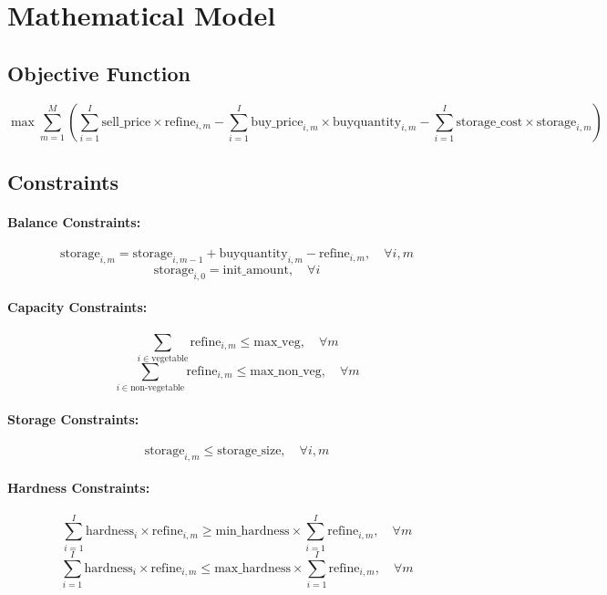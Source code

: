 \documentclass{article}
\begin{document}
\section*{Mathematical Model}

\subsection*{Objective Function}
\[
\max \sum_{m=1}^{M} \left( \sum_{i=1}^{I} \text{sell\_price} \times \text{refine}_{i,m} - \sum_{i=1}^{I} \text{buy\_price}_{i,m} \times \text{buyquantity}_{i,m} - \sum_{i=1}^{I} \text{storage\_cost} \times \text{storage}_{i,m} \right)
\]

\subsection*{Constraints}

\paragraph{Balance Constraints:}
\[
\text{storage}_{i,m} = \text{storage}_{i,m-1} + \text{buyquantity}_{i,m} - \text{refine}_{i,m}, \quad \forall i, m
\]
\[
\text{storage}_{i,0} = \text{init\_amount}, \quad \forall i 
\]

\paragraph{Capacity Constraints:}
\[
\sum_{i \in \text{vegetable}} \text{refine}_{i,m} \leq \text{max\_veg}, \quad \forall m
\]
\[
\sum_{i \in \text{non-vegetable}} \text{refine}_{i,m} \leq \text{max\_non\_veg}, \quad \forall m
\]

\paragraph{Storage Constraints:}
\[
\text{storage}_{i,m} \leq \text{storage\_size}, \quad \forall i, m
\]

\paragraph{Hardness Constraints:}
\[
\sum_{i=1}^{I} \text{hardness}_{i} \times \text{refine}_{i,m} \geq \text{min\_hardness} \times \sum_{i=1}^{I} \text{refine}_{i,m}, \quad \forall m
\]
\[
\sum_{i=1}^{I} \text{hardness}_{i} \times \text{refine}_{i,m} \leq \text{max\_hardness} \times \sum_{i=1}^{I} \text{refine}_{i,m}, \quad \forall m
\]
\end{document}
